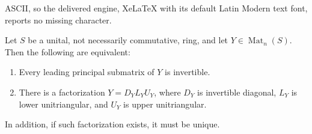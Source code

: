 \documentclass[10pt,a4paper]{amsart}
\newcommand{\Mat}{\operatorname{Mat}}
\begin{document}
ASCII, so the delivered engine, XeLaTeX with its default Latin Modern text font, reports no missing character.
\begin{lemma}\label{lem:LU_decomposition}
Let \(S\) be a unital, not necessarily commutative, ring, and let
\(Y\in\Mat_n(S)\). Then the following are equivalent:
\begin{enumerate}[label=\textup{(\roman*)},leftmargin=2.2em]
\item Every leading principal submatrix of $Y$ is invertible.
\item There is a factorization $Y=D_YL_YU_Y$, where \(D_Y\) is invertible diagonal, \(L_Y\) is lower
unitriangular, and \(U_Y\) is upper unitriangular.
\end{enumerate}
In addition, if such factorization exists, it must be unique.
\end{lemma}
\end{document}
